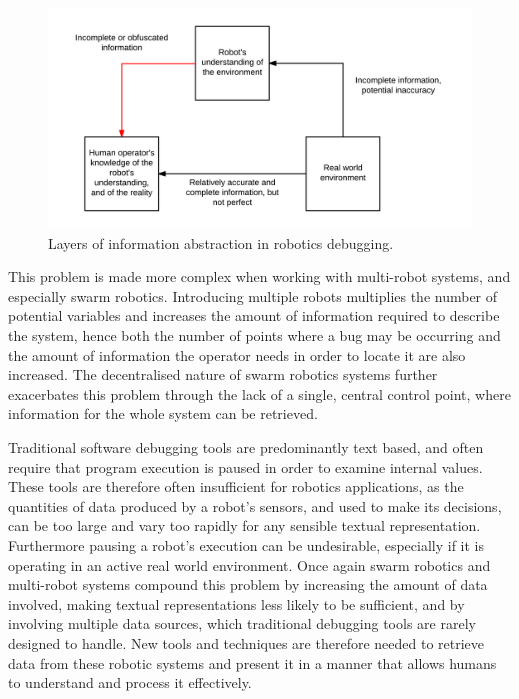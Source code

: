 \begin{figure}
	\centering
	\includegraphics{Figures/RobotDebuggingInformationAbstraction.png}
	\decoRule
	\caption[Debugging Information Abstraction Diagram]{Layers of information abstraction in robotics debugging.}
	\label{fig:DebuggingInformation}
\end{figure}

This problem is made more complex when working with multi-robot systems, and especially swarm robotics. Introducing multiple robots multiplies the number of potential variables and increases the amount of information required to describe the system, hence both the number of points where a bug may be occurring and the amount of information the operator needs in order to locate it are also increased. The decentralised nature of swarm robotics systems further exacerbates this problem through the lack of a single, central control point, where information for the whole system can be retrieved.

Traditional software debugging tools are predominantly text based, and often require that program execution is paused in order to examine internal values. These tools are therefore often insufficient for robotics applications, as the quantities of data produced by a robot's sensors, and used to make its decisions, can be too large and vary too rapidly for any sensible textual representation. Furthermore pausing a robot's execution can be undesirable, especially if it is operating in an active real world environment. Once again swarm robotics  and multi-robot systems compound this problem by increasing the amount of data involved, making textual representations less likely to be sufficient, and by involving multiple data sources, which traditional debugging tools are rarely designed to handle. New tools and techniques are therefore needed to retrieve data from these robotic systems and present it in a manner that allows humans to understand and process it effectively.

